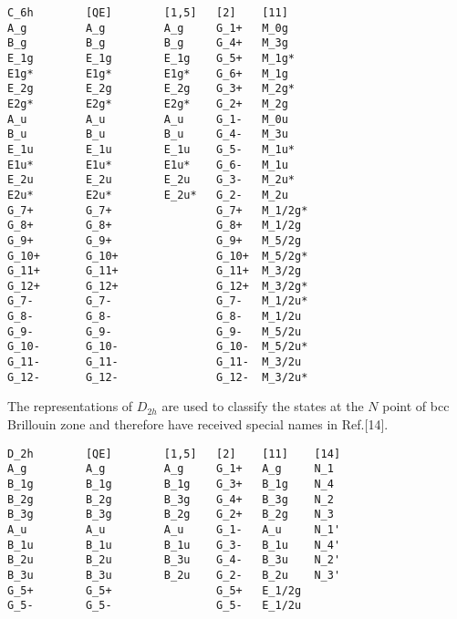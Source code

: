 \documentclass[12pt,a4paper,twoside]{report}
\begin{document}
\begin{tcolorbox}
\begin{footnotesize}
\begin{verbatim}
C_6h        [QE]        [1,5]   [2]    [11]
A_g         A_g         A_g     G_1+   M_0g
B_g         B_g         B_g     G_4+   M_3g
E_1g        E_1g        E_1g    G_5+   M_1g*
E1g*        E1g*        E1g*    G_6+   M_1g
E_2g        E_2g        E_2g    G_3+   M_2g*
E2g*        E2g*        E2g*    G_2+   M_2g
A_u         A_u         A_u     G_1-   M_0u
B_u         B_u         B_u     G_4-   M_3u
E_1u        E_1u        E_1u    G_5-   M_1u*
E1u*        E1u*        E1u*    G_6-   M_1u
E_2u        E_2u        E_2u    G_3-   M_2u*
E2u*        E2u*        E_2u*   G_2-   M_2u
G_7+        G_7+                G_7+   M_1/2g*
G_8+        G_8+                G_8+   M_1/2g
G_9+        G_9+                G_9+   M_5/2g
G_10+       G_10+               G_10+  M_5/2g*
G_11+       G_11+               G_11+  M_3/2g
G_12+       G_12+               G_12+  M_3/2g*
G_7-        G_7-                G_7-   M_1/2u*
G_8-        G_8-                G_8-   M_1/2u
G_9-        G_9-                G_9-   M_5/2u
G_10-       G_10-               G_10-  M_5/2u*
G_11-       G_11-               G_11-  M_3/2u
G_12-       G_12-               G_12-  M_3/2u*
\end{verbatim}
\end{footnotesize}
\end{tcolorbox}

The representations of $D_{2h}$ are used to classify the states at the $N$
point of bcc Brillouin zone and therefore have received special names 
in Ref.[14].

\begin{tcolorbox}
\begin{footnotesize}
\begin{verbatim}
D_2h        [QE]        [1,5]   [2]    [11]    [14]
A_g         A_g         A_g     G_1+   A_g     N_1
B_1g        B_1g        B_1g    G_3+   B_1g    N_4
B_2g        B_2g        B_3g    G_4+   B_3g    N_2
B_3g        B_3g        B_2g    G_2+   B_2g    N_3
A_u         A_u         A_u     G_1-   A_u     N_1'
B_1u        B_1u        B_1u    G_3-   B_1u    N_4'
B_2u        B_2u        B_3u    G_4-   B_3u    N_2'
B_3u        B_3u        B_2u    G_2-   B_2u    N_3'
G_5+        G_5+                G_5+   E_1/2g
G_5-        G_5-                G_5-   E_1/2u
\end{verbatim}
\end{footnotesize}
\end{tcolorbox}
\end{document}
